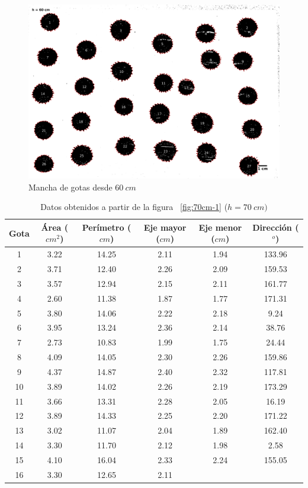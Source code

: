 \begin{figure}[H] \centering
\includegraphics[width=0.60\linewidth]{src/60-1.png} \caption{Mancha de gotas
desde $60\ cm$} \label{fig:60cm-1} \end{figure}

\begin{table}[H] \centering \caption{Datos obtenidos a partir de la figura
    ~\ref{fig:70cm-1} ($h=70\ cm)$} \label{tab:70cm} \begin{tabular}{cccccc}
        \toprule Gota & Área ($cm^2$) & Perímetro ($cm$) & Eje mayor ($cm$) &
        Eje menor ($cm$) & Dirección ($^o$) \\ \midrule 1  & 3.22 & 14.25 &
        2.11 & 1.94 & 133.96 \\ 2  & 3.71 & 12.40 & 2.26 & 2.09 & 159.53 \\ 3
             & 3.57 & 12.94 & 2.15 & 2.11 & 161.77 \\ 4  & 2.60 & 11.38 & 1.87
             & 1.77 & 171.31 \\ 5  & 3.80 & 14.06 & 2.22 & 2.18 & 9.24   \\ 6
             & 3.95 & 13.24 & 2.36 & 2.14 & 38.76  \\ 7  & 2.73 & 10.83 & 1.99
             & 1.75 & 24.44  \\ 8  & 4.09 & 14.05 & 2.30 & 2.26 & 159.86 \\ 9
             & 4.37 & 14.87 & 2.40 & 2.32 & 117.81 \\ 10 & 3.89 & 14.02 & 2.26
             & 2.19 & 173.29 \\ 11 & 3.66 & 13.31 & 2.28 & 2.05 & 16.19  \\ 12
             & 3.89 & 14.33 & 2.25 & 2.20 & 171.22 \\ 13 & 3.02 & 11.07 & 2.04
             & 1.89 & 162.40 \\ 14 & 3.30 & 11.70 & 2.12 & 1.98 & 2.58   \\ 15
             & 4.10 & 16.04 & 2.33 & 2.24 & 155.05 \\ 16 & 3.30 & 12.65 & 2.11

\end{tabular}
\end{table}
